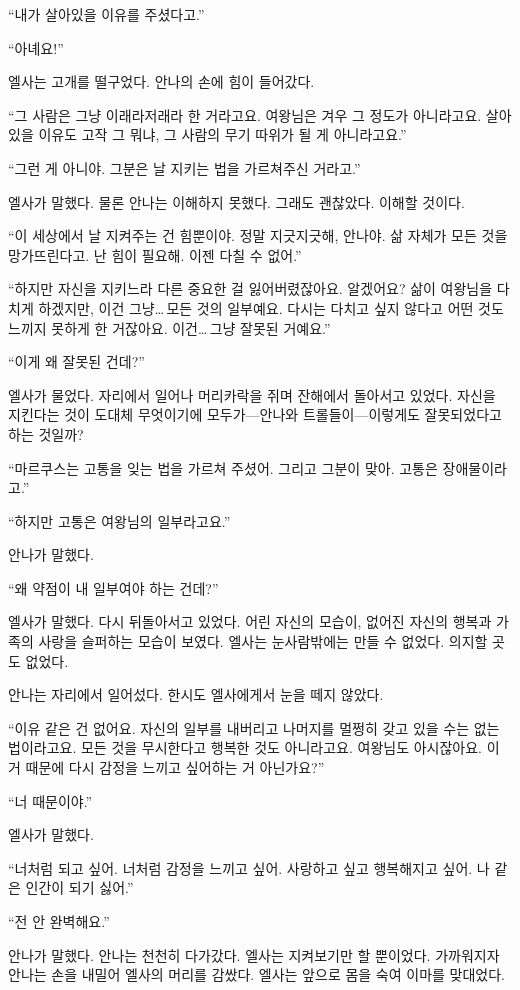 ``내가 살아있을 이유를 주셨다고.''

``아녜요!''

엘사는 고개를 떨구었다. 안나의 손에 힘이 들어갔다.

``그 사람은 그냥 이래라저래라 한 거라고요. 여왕님은 겨우 그 정도가 아니라고요. 살아있을 이유도 고작 그 뭐냐, 그 사람의 무기 따위가 될 게 아니라고요.''

``그런 게 아니야. 그분은 날 지키는 법을 가르쳐주신 거라고.''

엘사가 말했다. 물론 안나는 이해하지 못했다. 그래도 괜찮았다. 이해할 것이다.

``이 세상에서 날 지켜주는 건 힘뿐이야. 정말 지긋지긋해, 안나야. 삶 자체가 모든 것을 망가뜨린다고. 난 힘이 필요해. 이젠 다칠 수 없어.''

``하지만 자신을 지키느라 다른 중요한 걸 잃어버렸잖아요. 알겠어요? 삶이 여왕님을 다치게 하겠지만, 이건 그냥\ldots\,모든 것의 일부예요. 다시는 다치고 싶지 않다고 어떤 것도 느끼지 못하게 한 거잖아요. 이건\ldots\,그냥 잘못된 거예요.''

``이게 왜 잘못된 건데?''

엘사가 물었다. 자리에서 일어나 머리카락을 쥐며 잔해에서 돌아서고 있었다. 자신을 지킨다는 것이 도대체 무엇이기에 모두가—안나와 트롤들이—이렇게도 잘못되었다고 하는 것일까?

``마르쿠스는 고통을 잊는 법을 가르쳐 주셨어. 그리고 그분이 맞아. 고통은 장애물이라고.''

``하지만 고통은 여왕님의 일부라고요.''

안나가 말했다.

``왜 약점이 내 일부여야 하는 건데?''

엘사가 말했다. 다시 뒤돌아서고 있었다. 어린 자신의 모습이, 없어진 자신의 행복과 가족의 사랑을 슬퍼하는 모습이 보였다. 엘사는 눈사람밖에는 만들 수 없었다. 의지할 곳도 없었다.

안나는 자리에서 일어섰다. 한시도 엘사에게서 눈을 떼지 않았다.

``이유 같은 건 없어요. 자신의 일부를 내버리고 나머지를 멀쩡히 갖고 있을 수는 없는 법이라고요. 모든 것을 무시한다고 행복한 것도 아니라고요. 여왕님도 아시잖아요. 이거 때문에 다시 감정을 느끼고 싶어하는 거 아닌가요?''

``너 때문이야.''

엘사가 말했다.

``너처럼 되고 싶어. 너처럼 감정을 느끼고 싶어. 사랑하고 싶고 행복해지고 싶어. 나 같은 인간이 되기 싫어.''

``전 안 완벽해요.''

안나가 말했다. 안나는 천천히 다가갔다. 엘사는 지켜보기만 할 뿐이었다. 가까워지자 안나는 손을 내밀어 엘사의 머리를 감쌌다. 엘사는 앞으로 몸을 숙여 이마를 맞대었다.

